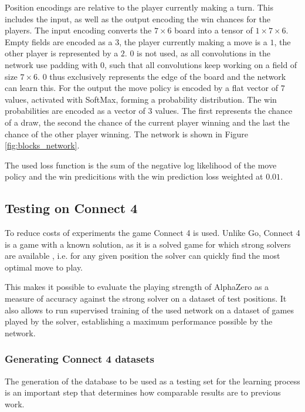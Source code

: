 \documentclass[12pt,onecolumn,oneside,titlepage]{article}
\begin{document}
Position encodings are relative to the player currently making a turn. This includes the input, as well as the output encoding the win chances for the players.
The input encoding converts the $7\times6$ board into a tensor of $1\times7\times6$. Empty fields are encoded as a $3$, the player currently making a move is a $1$, the other player is represented by a $2$. $0$ is not used, as all convolutions 
in the network use padding with $0$, such that all convolutions keep working on a field of size $7\times6$. $0$ thus exclusively represents the edge of the board and the network can learn this.
For the output the move policy is encoded by a flat vector of $7$ values, activated with SoftMax, forming a probability distribution. The win probabilities are encoded as a vector of $3$ values. The first represents the chance of a draw, the second the chance of the
current player winning and the last the chance of the other player winning. The network is shown in Figure \ref{fig:blocks_network}.

The used loss function is the sum of the negative log likelihood of the move policy and the win predicitions with the win prediction loss weighted at $0.01$. 


\subsection{Testing on Connect 4}

To reduce costs of experiments the game Connect 4 is used. Unlike Go, Connect 4 is a game with a known solution, as it is a solved game for which strong solvers are available \cite{trompsolved, pascalsolver, pascalsolvergithub}, 
i.e. for any given position the solver can quickly find the most optimal move to play.

This makes it possible to evaluate the playing strength of AlphaZero as a measure of accuracy against the strong solver on a dataset of test positions.
It also allows to run supervised training of the used network on a dataset of games played by the solver, establishing a maximum performance possible by the network.

\subsubsection{Generating Connect 4 datasets}
\label{s:generate_dataset}


The generation of the database to be used as a testing set for the learning process is an important step that determines how comparable results are to previous work. 
\end{document}
